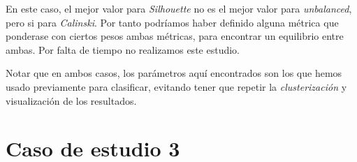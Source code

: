 \documentclass[11pt]{article}
\begin{document}
En este caso, el mejor valor para \emph{Silhouette} no es el mejor valor para \emph{unbalanced}, pero si para \emph{Calinski}. Por tanto podríamos haber definido alguna métrica que ponderase con ciertos pesos ambas métricas, para encontrar un equilibrio entre ambas. Por falta de tiempo no realizamos este estudio.

Notar que en ambos casos, los parámetros aquí encontrados son los que hemos usado previamente para clasificar, evitando tener que repetir la \emph{clusterización} y visualización de los resultados.

\pagebreak




\pagebreak

\section{Caso de estudio 3}

\pagebreak



\end{document}
